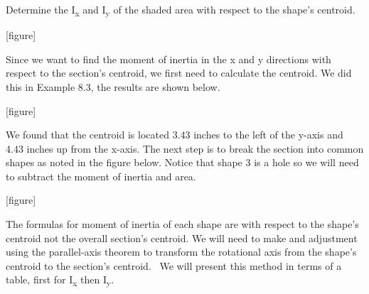 \documentclass[
  letterpaper,
  DIV=11,
  numbers=noendperiod]{scrreprt}
\begin{document}
\begin{tcolorbox}[enhanced jigsaw, breakable, opacityback=0, toptitle=1mm, left=2mm, colback=white, opacitybacktitle=0.6, colframe=quarto-callout-tip-color-frame, titlerule=0mm, arc=.35mm, leftrule=.75mm, bottomtitle=1mm, colbacktitle=quarto-callout-tip-color!10!white, rightrule=.15mm, title={Example 8.6: Moment of Inertia}, bottomrule=.15mm, toprule=.15mm, coltitle=black]

Determine the I\textsubscript{x} and I\textsubscript{y} of the shaded
area with respect to the shape's centroid.

{[}figure{]}

\begin{tcolorbox}[enhanced jigsaw, breakable, opacityback=0, toptitle=1mm, left=2mm, colback=white, opacitybacktitle=0.6, colframe=quarto-callout-tip-color-frame, titlerule=0mm, arc=.35mm, leftrule=.75mm, bottomtitle=1mm, colbacktitle=quarto-callout-tip-color!10!white, rightrule=.15mm, title={Solution}, bottomrule=.15mm, toprule=.15mm, coltitle=black]

Since we want to find the moment of inertia in the x and y directions
with respect to the section's centroid, we first need to calculate the
centroid. We did this in Example 8.3, the results are shown below.

{[}figure{]}

We found that the centroid is located 3.43 inches to the left of the
y-axis and 4.43 inches up from the x-axis. The next step is to break the
section into common shapes as noted in the figure below. Notice that
shape 3 is a hole so we will need to subtract the moment of inertia and
area.

{[}figure{]}

The formulas for moment of inertia of each shape are with respect to the
shape's centroid not the overall section's centroid. We will need to
make and adjustment using the parallel-axis theorem to transform the
rotational axis from the shape's centroid to the section's centroid.~ We
will present this method in terms of a table, first for
I\textsubscript{x} then I\textsubscript{y}.


\end{tcolorbox}
\end{tcolorbox}
\end{document}
